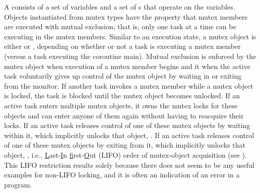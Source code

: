 \documentclass[openright,twoside]{report}
\begin{document}
A  consists of a set of variables and a set of s that operate on the variables.
Objects instantiated from mutex types have the property that mutex members are executed with mutual exclusion;
that is, only one task at a time can be executing in the mutex members.
Similar to an execution state, a mutex object is either  or , depending on whether or not a task is executing a mutex member (versus a task executing the coroutine main).
Mutual exclusion is enforced by  the mutex object when execution of a mutex member begins and  it when the active task voluntarily gives up control of the mutex object by waiting in or exiting from the monitor.
If another task invokes a mutex member while a mutex object is locked, the task is blocked until the mutex object becomes unlocked.
If an active task enters multiple mutex objects, it owns the mutex locks for these objects and can enter anyone of them again without having to reacquire their locks.
If an active task releases control of one of these mutex objects by waiting within it, which implicitly unlocks that object, .
If an active task releases control of one of these mutex objects by exiting from it, which implicitly unlocks that object, , i.e., \underline{L}ast-\underline{I}n \underline{f}irst-\underline{O}ut (LIFO) order of mutex-object acquisition (see ).
This LIFO restriction results solely because there does not seem to be any useful examples for non-LIFO locking, and it is often an indication of an error in a program.
\end{document}
